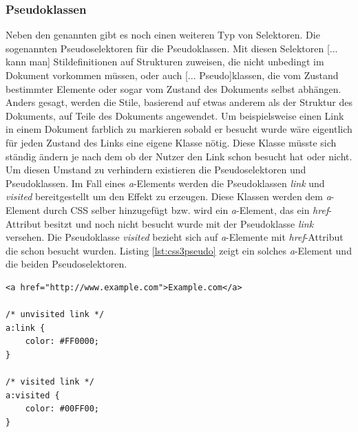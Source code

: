 \subsubsection{Pseudoklassen} Neben den genannten gibt es noch einen weiteren Typ von Selektoren. Die sogenannten Pseudoselektoren für die Pseudoklassen. \glqq Mit diesen Selektoren [... kann man] Stildefinitionen auf Strukturen zuweisen, die nicht unbedingt im Dokument vorkommen müssen, oder auch [... Pseudo]klassen, die vom Zustand bestimmter Elemente oder sogar vom Zustand des Dokuments selbst abhängen. Anders gesagt, werden die Stile, basierend auf etwas anderem als der Struktur des Dokuments, auf Teile des Dokuments angewendet.\grqq{}\cite[S.53ff]{MeyeCasc2005} Um beispielsweise einen Link in einem Dokument farblich zu markieren sobald er besucht wurde wäre eigentlich für jeden Zustand des Links eine eigene Klasse nötig. Diese Klasse müsste sich ständig ändern je nach dem ob der Nutzer den Link schon besucht hat oder nicht. Um diesen Umstand zu verhindern existieren die Pseudoselektoren und Pseudoklassen. Im Fall eines \textit{a}-Elements werden die Pseudoklassen \textit{link} und \textit{visited} bereitgestellt um den Effekt zu erzeugen. Diese Klassen werden dem \textit{a}-Element durch CSS selber hinzugefügt bzw. wird ein \textit{a}-Element, das ein \textit{href}-Attribut besitzt und noch nicht besucht wurde mit der Pseudoklasse \textit{link} versehen. Die Pseudoklasse \textit{visited} bezieht sich auf \textit{a}-Elemente mit \textit{href}-Attribut die schon besucht wurden. Listing \ref{lst:css3pseudo} zeigt ein solches \textit{a}-Element und die beiden Pseudoselektoren.

	\vspace{1em}
	\begin{lstlisting}[frame=htrbl, caption=CSS3 Pseudoklassen und -selektoren, label=lst:css3pseudo]
<a href="http://www.example.com">Example.com</a>

/* unvisited link */
a:link {
    color: #FF0000;
}

/* visited link */
a:visited {
    color: #00FF00;
}
	\end{lstlisting}

